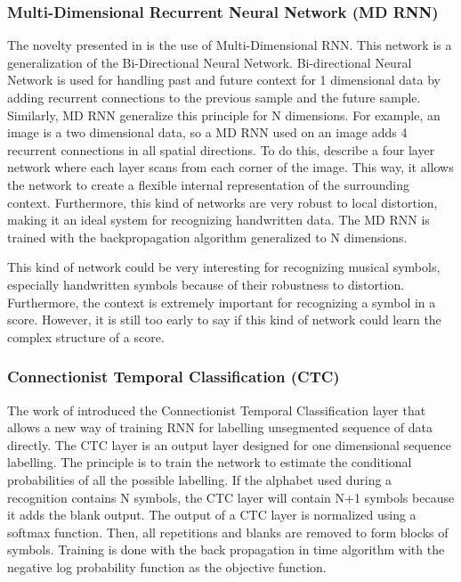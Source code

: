 \documentclass[11pt]{sdm}
\begin{document}
\subsubsection{Multi-Dimensional Recurrent Neural Network (MD RNN)}

The novelty presented in \cite{graves_offline_2009} is the use of Multi-Dimensional RNN.
This network is a generalization of the Bi-Directional Neural Network.
Bi-directional Neural Network is used for handling past and future context for 1 dimensional data by adding recurrent connections to the previous sample and the future sample.
Similarly, MD RNN generalize this principle for N dimensions.
For example, an image is a two dimensional data, so a MD RNN used on an image adds 4 recurrent connections in all spatial directions.
To do this, \cite{graves_offline_2009} describe a four layer network where each layer scans from each corner of the image.
This way, it allows the network to create a flexible internal representation of the surrounding context.
Furthermore, this kind of networks are very robust to local distortion, making it an ideal system for recognizing handwritten data.
The MD RNN is trained with the backpropagation algorithm generalized to N dimensions.

This kind of network could be very interesting for recognizing musical symbols, especially handwritten symbols because of their robustness to distortion.
Furthermore, the context is extremely important for recognizing a symbol in a score.
However, it is still too early to say if this kind of network could learn the complex structure of a score.

\subsubsection{Connectionist Temporal Classification (CTC)}

The work of \cite{graves_connectionist_2006} introduced the Connectionist Temporal Classification layer that allows a new way of training RNN for labelling unsegmented sequence of data directly.
The CTC layer is an output layer designed for one dimensional sequence labelling.
The principle is to train the network to estimate the conditional probabilities of all the possible labelling.
If the alphabet used during a recognition contains N symbols, the CTC layer will contain N+1 symbols because it adds the blank output.
The output of a CTC layer is normalized using a softmax function.
Then, all repetitions and blanks are removed to form blocks of symbols.
Training is done with the back propagation in time algorithm with the negative log probability function as the objective function.
\end{document}

